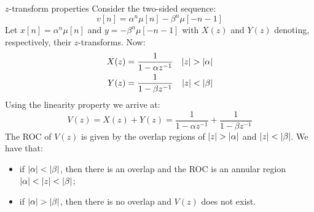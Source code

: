 \documentclass[../../main/main.tex]{subfiles}
\begin{document}
\begin{example}{\boldmath\( z \)-transform properties}{}
    Consider the two-sided sequence:
    \begin{equation}
        v[n]
        =
        \alpha^{n} \mu[n] - \beta^{n} \mu[-n-1]
        \label{eq:L14_S65_1}
    \end{equation}
    Let \( x[n] = \alpha^{n} \mu[n] \) and \( y = - \beta^{n} \mu[-n-1] \) with \( X(z) \) and \( Y(z) \) denoting, respectively, their \( z \)-transforms. Now:
    \begin{align}
        X(z) &= \frac{1}{1 - \alpha z^{-1}}   &   \abs{z} > \abs{\alpha}  \\
        Y(z) &= \frac{1}{1 - \beta z^{-1}}  &   \abs{z} < \abs{\beta}
    \end{align}
    Using the linearity property we arrive at:
    \begin{equation}
        V(z)
        =
        X(z) + Y(z)
        =
        \frac{1}{1 - \alpha z^{-1}} + \frac{1}{1 - \beta z^{-1}}
        \label{eq:L14_S66_1}
    \end{equation}
    The ROC of \( V(z) \) is given by the overlap regions of \( \abs{z} > \abs{\alpha} \) and \( \abs{z} < \abs{\beta} \). We have that:
    \begin{itemize}
        \item if \( \abs{\alpha} < \abs{\beta} \), then there is an overlap and the ROC is an annular region \( \abs{\alpha} < \abs{z} < \abs{\beta} \);
        \item if \( \abs{\alpha} > \abs{\beta} \), then there is no overlap and \( V(z) \) does not exist.
    \end{itemize}
\end{example}
\end{document}
